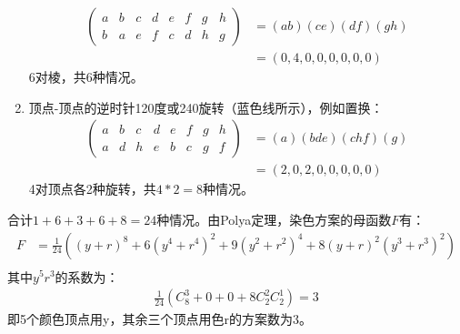 \begin{solution}
\begin{enumerate}
\begin{align*}
         \left(
            \begin{matrix}
               a & b & c & d & e & f & g & h\\
               b & a & e & f & c & d & h & g
            \end{matrix}
            \right) &= (ab)(ce)(df)(gh) \\
            &= (0,4,0,0,0,0,0,0)
      \end{align*}
      6对棱，共$6$种情况。
      \item 顶点-顶点的逆时针120度或240旋转（蓝色线所示），例如置换：
      \begin{align*}
         \left(
            \begin{matrix}
               a & b & c & d & e & f & g & h\\
               a & d & h & e & b & c & g & f
            \end{matrix}
            \right) &= (a)(bde)(chf)(g) \\
            &= (2,0,2,0,0,0,0,0)
      \end{align*}
      4对顶点各2种旋转，共$4*2=8$种情况。
   \end{enumerate}
   合计$1+6+3+6+8=24$种情况。由Polya定理，染色方案的母函数$F$有：
   \begin{align*}
      F&=\frac{1}{24}\left((y+r)^8+6(y^4+r^4)^2+9(y^2+r^2)^4+8(y+r)^2(y^3+r^3)^2\right)\\
   \end{align*}
   其中$y^5r^3$的系数为：
   \begin{align*}
      \frac{1}{24}\left(C_8^3+0+0+8C_2^2C_2^1\right) = 3
   \end{align*}
   即5个颜色顶点用y，其余三个顶点用色r的方案数为3。
\end{solution}